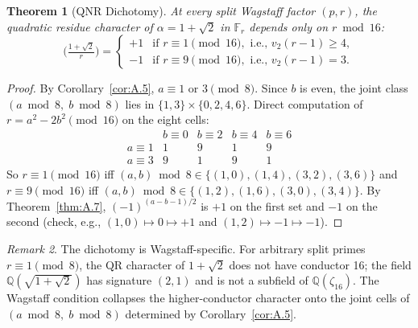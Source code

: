 \documentclass[12pt]{article}
\theoremstyle{plain}
\newtheorem{theorem}{Theorem}[section]
\theoremstyle{definition}
\theoremstyle{remark}
\newtheorem{remark}[theorem]{Remark}
\begin{document}
\begin{theorem}[QNR Dichotomy]\label{thm:A.8}
At every split Wagstaff factor
\((p, r)\), the quadratic residue character of
\(\alpha = 1+\sqrt 2\) in \(\mathbb F_r\) depends only on
\(r \bmod 16\):
\[
\bigl(\tfrac{1+\sqrt 2}{r}\bigr) =
\begin{cases}
+1 & \text{if } r \equiv 1 \pmod{16}, \text{ i.e., } v_2(r-1) \geq 4, \\
-1 & \text{if } r \equiv 9 \pmod{16}, \text{ i.e., } v_2(r-1) = 3.
\end{cases}
\]
\end{theorem}


\begin{proof}
By Corollary~\ref{cor:A.5}, \(a \equiv 1\) or \(3 \pmod 8\). Since
\(b\) is even, the joint class \((a \bmod 8,\; b \bmod 8)\) lies
in \(\{1, 3\} \times \{0, 2, 4, 6\}\). Direct computation of
\(r = a^2 - 2b^2 \pmod{16}\) on the eight cells:
\[
\begin{array}{c|cccc}
 & b\equiv 0 & b\equiv 2 & b\equiv 4 & b\equiv 6 \\\hline
a\equiv 1 & 1 & 9 & 1 & 9 \\
a\equiv 3 & 9 & 1 & 9 & 1
\end{array}
\]
So \(r \equiv 1 \pmod{16}\) iff \((a,b) \bmod 8 \in
\{(1,0),(1,4),(3,2),(3,6)\}\) and \(r \equiv 9 \pmod{16}\) iff
\((a,b) \bmod 8 \in \{(1,2),(1,6),(3,0),(3,4)\}\). By Theorem~\ref{thm:A.7},
\((-1)^{(a-b-1)/2}\) is \(+1\) on the first set and \(-1\) on the
second (check, e.g., \((1,0)\mapsto 0 \mapsto +1\) and
\((1,2)\mapsto -1 \mapsto -1\)).\end{proof}


\begin{remark}
The dichotomy is Wagstaff-specific. For arbitrary split
primes \(r \equiv 1 \pmod 8\), the QR character of \(1+\sqrt 2\)
does not have conductor 16; the field
\(\mathbb Q(\sqrt{1+\sqrt 2})\) has signature \((2,1)\) and is not
a subfield of \(\mathbb Q(\zeta_{16})\). The Wagstaff condition
collapses the higher-conductor character onto the joint cells of
\((a \bmod 8,\; b \bmod 8)\) determined by Corollary~\ref{cor:A.5}.
\end{remark}
\end{document}
